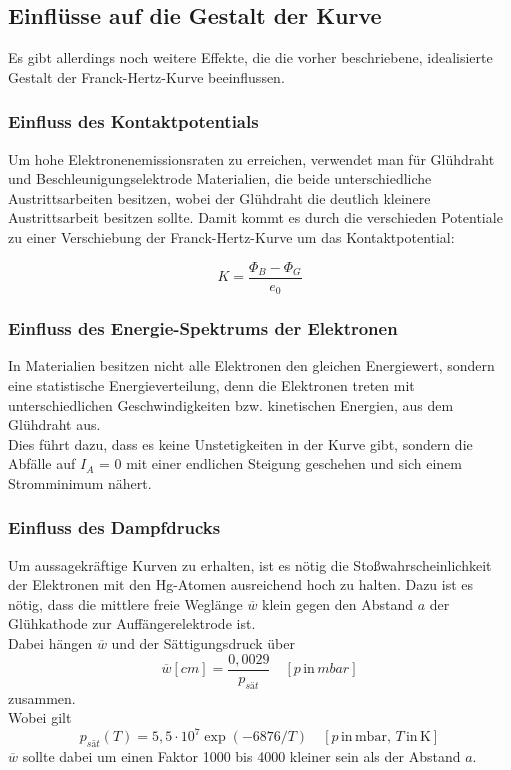 \subsection{Einflüsse auf die Gestalt der Kurve}
Es gibt allerdings noch weitere Effekte, die die vorher beschriebene, idealisierte Gestalt der Franck-Hertz-Kurve beeinflussen.

\subsubsection{Einfluss des Kontaktpotentials}
Um hohe Elektronenemissionsraten zu erreichen, verwendet man für Glühdraht und Beschleunigungselektrode Materialien, die beide unterschiedliche Austrittsarbeiten besitzen, wobei der Glühdraht die deutlich kleinere Austrittsarbeit besitzen sollte. Damit kommt es durch die verschieden Potentiale zu einer Verschiebung der Franck-Hertz-Kurve um das Kontaktpotential:

\begin{equation}
K = \frac{\Phi_B - \Phi_G}{e_0}
\end{equation}

\subsubsection{Einfluss des Energie-Spektrums der Elektronen}
In Materialien besitzen nicht alle Elektronen den gleichen Energiewert, sondern eine statistische Energieverteilung, denn die Elektronen treten mit unterschiedlichen Geschwindigkeiten bzw. kinetischen Energien, aus dem Glühdraht aus.\\
Dies führt dazu, dass es keine Unstetigkeiten in der Kurve gibt, sondern die Abfälle auf $I_A$ = 0 mit einer endlichen Steigung geschehen und sich einem Stromminimum nähert.\\

\subsubsection{Einfluss des Dampfdrucks}
Um aussagekräftige Kurven zu erhalten, ist es nötig die Stoßwahrscheinlichkeit der Elektronen mit den Hg-Atomen ausreichend hoch zu halten. Dazu ist es nötig, dass die mittlere freie Weglänge $\overline{w}$ klein gegen den Abstand $a$ der Glühkathode zur Auffängerelektrode ist.\\
Dabei hängen $\overline{w}$ und der Sättigungsdruck über
\begin{equation}
\label{eq:Theorie_Weglaenge}
\overline{w} [cm] = \frac{0,0029}{p_{sät}} \quad [p \, \text{in} \, mbar]
\end{equation}
zusammen.\\

Wobei gilt
\begin{equation}
\label{eq:Theorie_Dampfdruck}
p_{sät}(T) = 5,5 \cdot 10^{7} \exp(-6876/T)\quad [p \, \text{in} \, \si{\milli\bar}, \, T \, \text{in} \, \si{\kelvin}]
\end{equation}
$\overline{w}$ sollte dabei um einen Faktor 1000 bis 4000 kleiner sein als der Abstand $a$.
